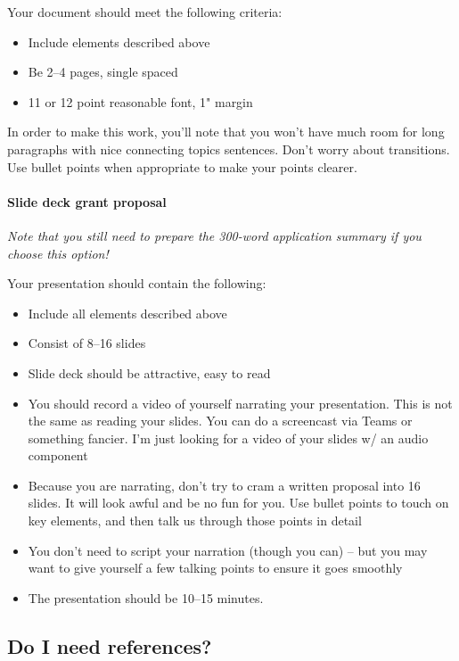 \documentclass[11pt]{article}
\begin{document}
Your document should meet the following criteria:

\begin{itemize}
\item
  Include elements described above
\item
  Be 2--4 pages, single spaced
\item
  11 or 12 point reasonable font, 1" margin
\end{itemize}

In order to make this work, you'll note that you won't have much room
for long paragraphs with nice connecting topics sentences. Don't worry
about transitions. Use bullet points when appropriate to make your
points clearer.

\hypertarget{slide-deck-grant-proposal}{%
\paragraph{Slide deck grant proposal}\label{slide-deck-grant-proposal}}

\emph{Note that you still need to prepare the 300-word application
summary if you choose this option!}

Your presentation should contain the following:

\begin{itemize}
\item
  Include all elements described above
\item
  Consist of 8–16 slides
\item
  Slide deck should be attractive, easy to read
\item
  You should record a video of yourself narrating your presentation.
  This is not the same as reading your slides. You can do a screencast
  via Teams or something fancier. I'm just looking for a video of your
  slides w/ an audio component
\item
  Because you are narrating, don't try to cram a written proposal into
  16 slides. It will look awful and be no fun for you. Use bullet points
  to touch on key elements, and then talk us through those points in
  detail
\item
  You don't need to script your narration (though you can) -- but you
  may want to give yourself a few talking points to ensure it goes
  smoothly
\item
  The presentation should be 10–15 minutes.
\end{itemize}

\hypertarget{do-i-need-references}{%
\subsection*{Do I need references?}\label{do-i-need-references}}
\end{document}
